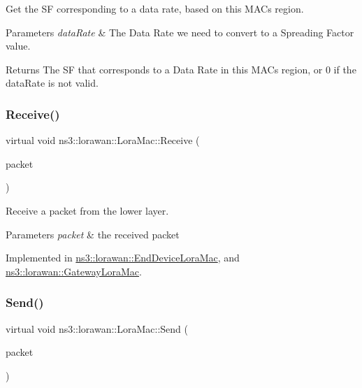 Get the SF corresponding to a data rate, based on this M\+AC\textquotesingle{}s region.


\begin{DoxyParams}{Parameters}
{\em data\+Rate} & The Data Rate we need to convert to a Spreading Factor value. \\
\hline
\end{DoxyParams}
\begin{DoxyReturn}{Returns}
The SF that corresponds to a Data Rate in this M\+AC\textquotesingle{}s region, or 0 if the data\+Rate is not valid. 
\end{DoxyReturn}
\mbox{\label{classns3_1_1lorawan_1_1LoraMac_a6eda46656789a277b8e103afcefdc21a}} 
\subsubsection{\texorpdfstring{Receive()}{Receive()}}
{\footnotesize\ttfamily virtual void ns3\+::lorawan\+::\+Lora\+Mac\+::\+Receive (\begin{DoxyParamCaption}\item[{Ptr$<$ Packet const $>$}]{packet }\end{DoxyParamCaption})\hspace{0.3cm}{\ttfamily [pure virtual]}}

Receive a packet from the lower layer.


\begin{DoxyParams}{Parameters}
{\em packet} & the received packet \\
\hline
\end{DoxyParams}


Implemented in \hyperlink{classns3_1_1lorawan_1_1EndDeviceLoraMac_a7bb29a550534c631e2ee7cc3407a2bcd}{ns3\+::lorawan\+::\+End\+Device\+Lora\+Mac}, and \hyperlink{classns3_1_1lorawan_1_1GatewayLoraMac_a8e53a57ec381d76bd47f51581b8c0df7}{ns3\+::lorawan\+::\+Gateway\+Lora\+Mac}.

\mbox{\label{classns3_1_1lorawan_1_1LoraMac_ac2f3fd92536658192bfa3d1523fff716}} 
\subsubsection{\texorpdfstring{Send()}{Send()}}
{\footnotesize\ttfamily virtual void ns3\+::lorawan\+::\+Lora\+Mac\+::\+Send (\begin{DoxyParamCaption}\item[{Ptr$<$ Packet $>$}]{packet }\end{DoxyParamCaption})\hspace{0.3cm}{\ttfamily [pure virtual]}}

